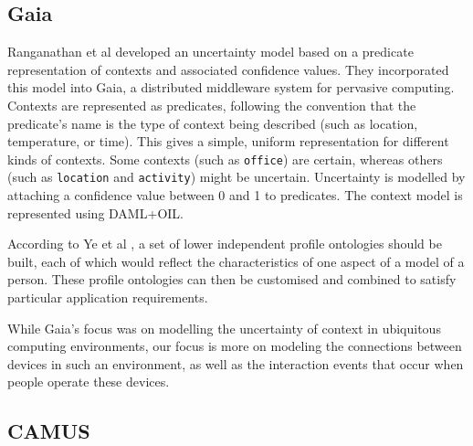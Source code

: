 \subsection{Gaia}
Ranganathan et al \cite{Ranganathan2004} developed an uncertainty model based on a predicate representation of contexts and associated confidence values. They incorporated this model into Gaia, a distributed middleware system for pervasive computing. Contexts are represented as predicates, following the convention that the predicate's name is the type of context being described (such as location, temperature, or time). This gives a simple, uniform representation for different kinds of contexts. Some contexts (such as \texttt{office}) are certain, whereas others (such as \texttt{location} and \texttt{activity}) might be uncertain. Uncertainty is modelled by attaching a confidence value between 0 and 1 to predicates. The context model is represented using \ac{DAML}+\ac{OIL}.



According to Ye et al \cite{Ye2007}, a set of lower independent profile ontologies should be built, each of which would reflect the characteristics of one aspect of a model of a person. These profile ontologies can then be customised and combined to satisfy particular application requirements.

While Gaia's focus was on modelling the uncertainty of context in ubiquitous computing environments, our focus is more on modeling the connections between devices in such an environment, as well as the interaction events that occur when people operate these devices.



\subsection{CAMUS}

